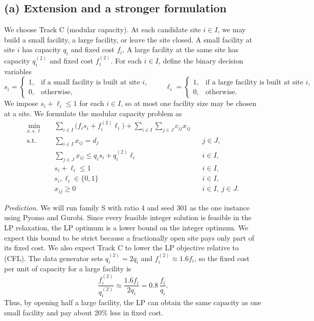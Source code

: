 \documentclass[11pt]{article}
\theoremstyle{definition}
\begin{document}
\subsection*{(a) Extension and a stronger formulation}
We choose Track C (modular capacity). At each candidate site $i\in I$,
we may build a small facility, a large facility, or leave the site closed. A small facility at site $i$ has capacity $q_i$ and fixed cost $f_i$. A large facility at the same site has capacity
$q_i^{(2)}$ and fixed cost $f_i^{(2)}$. For each $i\in I$, define the binary decision variables
\[
s_i =
\begin{cases}
1, & \text{if a small facility is built at site } i,\\
0, & \text{otherwise},
\end{cases}
\qquad
\ell_i =
\begin{cases}
1, & \text{if a large facility is built at site } i,\\
0, & \text{otherwise}.
\end{cases}
\]
We impose $s_i+\ell_i\le 1$ for each $i\in I$, so at most one
facility size may be chosen at a site. We formulate the modular capacity problem as
\[
\boxed{
\begin{aligned}
\min_{x,s,\ell}\quad
    & \sum_{i\in I} \bigl(f_i s_i + f_i^{(2)}\ell_i\bigr)
      + \sum_{i\in I}\sum_{j\in J} c_{ij}x_{ij} \\[0.6em]
\text{s.t.}\quad
    & \sum_{i\in I} x_{ij} = d_j
    && j\in J, \\
    & \sum_{j\in J} x_{ij} \le q_i s_i + q_i^{(2)}\ell_i
    && i\in I, \\
    & s_i + \ell_i \le 1
    && i\in I, \\
    & s_i,\ell_i \in \{0,1\}
    && i\in I, \\
    & x_{ij} \ge 0
    && i\in I,\ j\in J.
\end{aligned}
\tag{CFL-C}
}
\]

\emph{Prediction.}
We will run family S with ratio 4 and seed 301 as the one instance using Pyomo and Gurobi. Since every feasible integer solution is feasible in the LP relaxation, the LP optimum is a lower bound on the integer optimum. We expect this bound to be strict because a fractionally open site pays only part of its fixed cost. We also expect Track C to lower the LP objective relative to (CFL).
The data generator sets $q_i^{(2)}=2q_i$ and $f_i^{(2)}\approx 1.6f_i$,
so the fixed cost per unit of capacity for a large facility is
\[
    \frac{f_i^{(2)}}{q_i^{(2)}} \approx \frac{1.6f_i}{2q_i}
    = 0.8\,\frac{f_i}{q_i}.
\]
Thus, by opening half a large facility, the LP can obtain the same
capacity as one small facility and pay about 20\% less in fixed cost.
\end{document}
